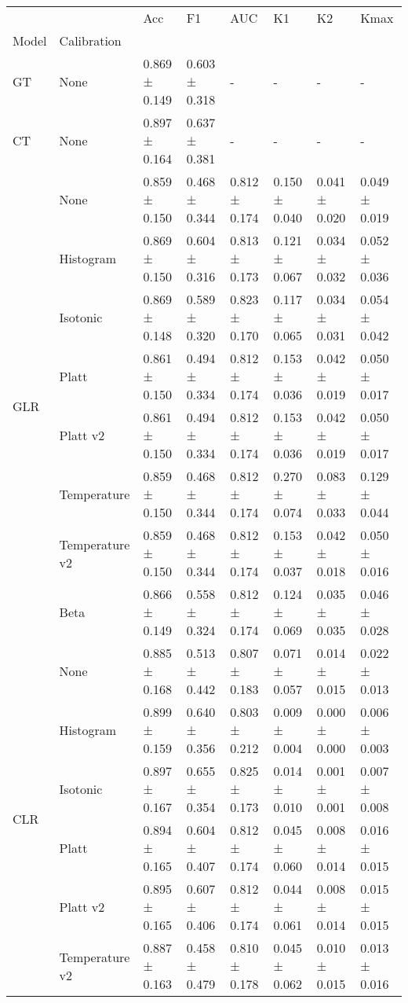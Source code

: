 \begin{tabular}{llllllll}
\toprule
 &  & Acc & F1 & AUC & K1 & K2 & Kmax \\
Model & Calibration &  &  &  &  &  &  \\
\midrule
GT & None & 0.869 ± 0.149 & 0.603 ± 0.318 & - & - & - & - \\
\cline{1-8}
CT & None & 0.897 ± 0.164 & 0.637 ± 0.381 & - & - & - & - \\
\cline{1-8}
\multirow[t]{8}{*}{GLR} & None & 0.859 ± 0.150 & 0.468 ± 0.344 & 0.812 ± 0.174 & 0.150 ± 0.040 & 0.041 ± 0.020 & 0.049 ± 0.019 \\
 & Histogram & 0.869 ± 0.150 & 0.604 ± 0.316 & 0.813 ± 0.173 & 0.121 ± 0.067 & 0.034 ± 0.032 & 0.052 ± 0.036 \\
 & Isotonic & 0.869 ± 0.148 & 0.589 ± 0.320 & 0.823 ± 0.170 & 0.117 ± 0.065 & 0.034 ± 0.031 & 0.054 ± 0.042 \\
 & Platt & 0.861 ± 0.150 & 0.494 ± 0.334 & 0.812 ± 0.174 & 0.153 ± 0.036 & 0.042 ± 0.019 & 0.050 ± 0.017 \\
 & Platt v2 & 0.861 ± 0.150 & 0.494 ± 0.334 & 0.812 ± 0.174 & 0.153 ± 0.036 & 0.042 ± 0.019 & 0.050 ± 0.017 \\
 & Temperature & 0.859 ± 0.150 & 0.468 ± 0.344 & 0.812 ± 0.174 & 0.270 ± 0.074 & 0.083 ± 0.033 & 0.129 ± 0.044 \\
 & Temperature v2 & 0.859 ± 0.150 & 0.468 ± 0.344 & 0.812 ± 0.174 & 0.153 ± 0.037 & 0.042 ± 0.018 & 0.050 ± 0.016 \\
 & Beta & 0.866 ± 0.149 & 0.558 ± 0.324 & 0.812 ± 0.174 & 0.124 ± 0.069 & 0.035 ± 0.035 & 0.046 ± 0.028 \\
\cline{1-8}
\multirow[t]{7}{*}{CLR} & None & 0.885 ± 0.168 & 0.513 ± 0.442 & 0.807 ± 0.183 & 0.071 ± 0.057 & 0.014 ± 0.015 & 0.022 ± 0.013 \\
 & Histogram & 0.899 ± 0.159 & 0.640 ± 0.356 & 0.803 ± 0.212 & 0.009 ± 0.004 & 0.000 ± 0.000 & 0.006 ± 0.003 \\
 & Isotonic & 0.897 ± 0.167 & 0.655 ± 0.354 & 0.825 ± 0.173 & 0.014 ± 0.010 & 0.001 ± 0.001 & 0.007 ± 0.008 \\
 & Platt & 0.894 ± 0.165 & 0.604 ± 0.407 & 0.812 ± 0.174 & 0.045 ± 0.060 & 0.008 ± 0.014 & 0.016 ± 0.015 \\
 & Platt v2 & 0.895 ± 0.165 & 0.607 ± 0.406 & 0.812 ± 0.174 & 0.044 ± 0.061 & 0.008 ± 0.014 & 0.015 ± 0.015 \\
 & Temperature v2 & 0.887 ± 0.163 & 0.458 ± 0.479 & 0.810 ± 0.178 & 0.045 ± 0.062 & 0.010 ± 0.015 & 0.013 ± 0.016 \\

\end{tabular}
